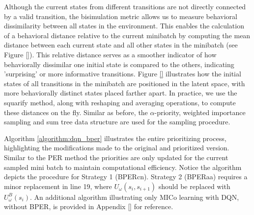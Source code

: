 Although the current states from different transitions are not directly connected by a valid transition, the bisimulation metric allows us to measure behavioral dissimilarity between all states in the environment. This enables the calculation of a behavioral distance relative to the current minibatch by computing the mean distance between each current state and all other states in the minibatch (see Figure \ref{}). This relative distance serves as a smoother indicator of how behaviorally dissimilar one initial state is compared to the others, indicating 'surprising' or more informative transitions. Figure \ref{} illustrates how the initial states of all transitions in the minibatch are positioned in the latent space, with more behaviorally distinct states placed farther apart. In practice, we use the squarify method, along with reshaping and averaging operations, to compute these distances on the fly. Similar as before, the $\alpha$-priority, weighted importance sampling and sum tree data structure are used for the sampling procedure.

Algorithm \ref{algorithm:dqn_bper} illustrates the entire prioritizing process, highlighting the modifications made to the original and prioritized version. Similar to the PER method the priorities are only updated for the current sampled mini batch to maintain computational efficiency. Notice the algorithm depicts the procedure for Strategy 1 (BPERcn). Strategy 2 (BPERaa) requires a minor replacement in line 19, where \(U_\omega(s_i, s_{i+1})\) should be replaced with \(U^B_\omega(s_i)\). An additional algorithm illustrating only MICo learning with DQN, without BPER, is provided in Appendix \ref{} for reference.

